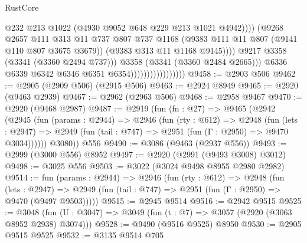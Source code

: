 \begin{lexlean}{RustCore}
\begin{coremodule}
                                                    @232
                                                    @213
                                                    @1022
                                                    (@4930 @9052 @648 @229 @213 @1021 @4942))))
                                              (@9268
                                                @2657
                                                @111
                                                @313
                                                @11
                                                @737
                                                @807
                                                @737
                                                @1168
                                                (@9383 @111 @11 @807 (@9141 @110 @807 @3675 @3679))
                                                (@9383 @313 @11 @1168 @9145))))
                                          @9217
                                          @3358
                                          (@3341 (@3360 @2494 @737)))
                                        @3358
                                        (@3341 (@3360 @2484 @2665)))
                                      @6336
                                      @6339
                                      @6342
                                      @6346
                                      @6351
                                      @6354)))))))))))))))))
@9458 := @2903 @506
@9462 := @2905 (@2909 @506) (@2915 @506)
@9463 := @2924 @8949
@9465 := @2920 (@9463 @2939)
@9467 := @2962 (@2963 @506)
@9468 := @2958 @9467
@9470 := @2920 (@9468 @2987)
@9487 := @2919
    (fun (fn : @27) =>
    @9465
      (@2942
        (@2945
          (fun (params : @2944) =>
          @2946
            (fun (rty : @612) =>
            @2948
              (fun (lets : @2947) =>
              @2949 (fun (tail : @747) => @2951 (fun (Γ : @2950) => @9470 @3034))))))
        @3080))
    @556
@9490 := @3086 (@9463 (@2937 @556))
@9493 := @2999 (@3000 @556) @8952
@9497 := @2920 (@2991 (@9493 @3008) @3012)
@9498 := @3025 @556
@9503 := @3022 (@3024 @9498 @8955 @2980 @2982)
@9514 := fun (params : @2944) =>
  @2946
    (fun (rty : @612) =>
    @2948
      (fun (lets : @2947) =>
      @2949 (fun (tail : @747) => @2951 (fun (Γ : @2950) => @9470 (@9497 @9503)))))
@9515 := @2945 @9514
@9516 := @2942 @9515
@9525 := @3048 (fun (U : @3047) => @3049 (fun (t : @7) => @3057 (@2920 (@3063 @8952 @2938) @3074)))
@9528 := @9490 (@9516 @9525) @8950
@9530 := @2905 @9515 @9525
@9532 := @3135 @9514 @705

\end{coremodule}
\end{lexlean}
